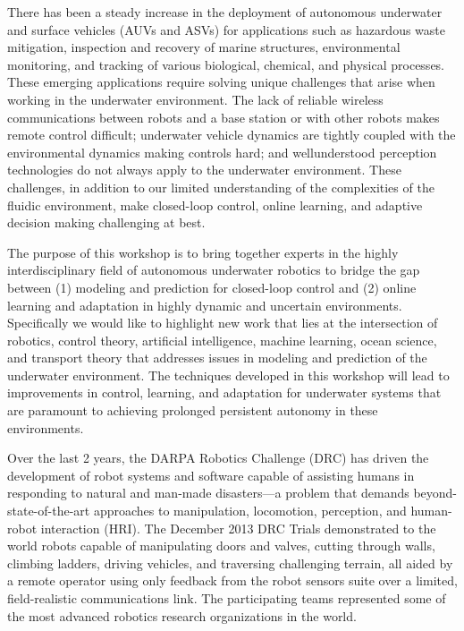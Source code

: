 \begin{spacing}{1.0}
{}



{
There has been a steady increase in the deployment of autonomous underwater and surface vehicles (AUVs and ASVs) for applications such as hazardous waste mitigation, inspection and recovery of marine structures, environmental monitoring, and tracking of various biological, chemical, and physical processes. These emerging applications require solving unique challenges that arise when working in the underwater environment. The lack of reliable wireless communications between robots and a base station or with other robots makes remote control difficult; underwater vehicle dynamics are tightly coupled with the environmental dynamics making controls hard; and wellunderstood perception technologies do not always apply to the underwater environment. These challenges, in addition to our limited understanding of the complexities of the fluidic environment, make closed-loop control, online learning, and adaptive decision making challenging at best. 

The purpose of this workshop is to bring together experts in the highly interdisciplinary field of autonomous underwater robotics to bridge the gap between (1) modeling and prediction for closed-loop control and (2) online learning and adaptation in highly dynamic and uncertain environments. Specifically we would like to highlight new work that lies at the intersection of robotics, control theory, artificial intelligence, machine learning, ocean science, and transport theory that addresses issues in modeling and prediction of the underwater environment. The techniques developed in this workshop will lead to improvements in control, learning, and adaptation for underwater systems that are paramount to achieving prolonged persistent autonomy in these environments. 

}


{
Over the last 2 years, the DARPA Robotics Challenge (DRC) has driven the development of robot systems and software capable of assisting humans in responding to natural and man-made disasters—a problem that demands beyond-state-of-the-art approaches to manipulation, locomotion, perception, and human-robot interaction (HRI). The December 2013 DRC Trials demonstrated to the world robots capable of manipulating doors and valves, cutting through walls, climbing ladders, driving vehicles, and traversing challenging terrain, all aided by a remote operator using only feedback from the robot sensors suite over a limited, field-realistic communications link. The participating teams represented some of the most advanced robotics research organizations in the world.

}
\end{spacing}
